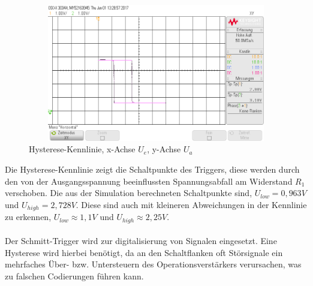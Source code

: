\begin{figure}[H]
 \begin{center}
  \includegraphics[height=6cm,width=12cm]{OsziBilder/SchmittTrigger_XY}
 \end{center}
 \caption{Hysterese-Kennlinie, x-Achse $U_e$, y-Achse $U_a$}
\end{figure}
\noindent
Die Hysterese-Kennlinie zeigt die Schaltpunkte des Triggers, diese werden durch den von der
Ausgangsspannung beeinflussten Spannungsabfall am Widerstand $R_1$ verschoben. Die aus der Simulation
berechneten Schaltpunkte sind, $U_{low}=0,963V$ und $U_{high}=2,728V$. Diese sind auch mit kleineren
Abweichungen in der Kennlinie zu erkennen, $U_{low}\approx 1,1V$ und $U_{high}\approx 2,25V$.\\
\\
Der Schmitt-Trigger wird zur digitalisierung von Signalen eingesetzt. Eine Hysterese wird hierbei benötigt,
da an den Schaltflanken oft Störsignale ein mehrfaches Über- bzw. Untersteuern des Operationsverstärkers verursachen, was
zu falschen Codierungen führen kann.
